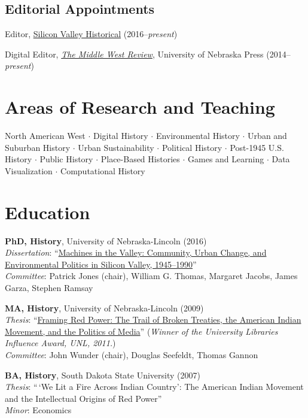 \vspace{0.8cm}

\subsection{Editorial Appointments}\label{editorial-appointments}

Editor, \href{http://svhistorical.org}{Silicon Valley Historical}
(2016--\emph{present})

Digital Editor, \emph{\href{https://uimiddle.wordpress.com/}{The Middle
West Review}}, University of Nebraska Press (2014--\emph{present})

\section{Areas of Research and
Teaching}\label{areas-of-research-and-teaching}

North American West \(\cdot\) Digital History \(\cdot\) Environmental
History \(\cdot\) Urban and Suburban History \(\cdot\) Urban
Sustainability \(\cdot\) Political History \(\cdot\) Post-1945 U.S.
History \(\cdot\) Public History \(\cdot\) Place-Based Histories
\(\cdot\) Games and Learning \(\cdot\) Data Visualization \(\cdot\)
Computational History

\section{Education}\label{education}

\textbf{PhD, History}, University of Nebraska-Lincoln (2016)\\
\emph{Dissertation}:
``\href{http://digitalcommons.unl.edu/historydiss/86/}{Machines in the
Valley: Community, Urban Change, and Environmental Politics in Silicon
Valley, 1945--1990}''\\
\emph{Committee}: Patrick Jones (chair), William G. Thomas, Margaret
Jacobs, James Garza, Stephen Ramsay

\textbf{MA, History}, University of Nebraska-Lincoln (2009)\\
\emph{Thesis}:
``\href{http://digitalcommons.unl.edu/historydiss/21/}{Framing Red
Power: The Trail of Broken Treaties, the American Indian Movement, and
the Politics of Media}'' (\emph{Winner of the University Libraries
Influence Award, UNL, 2011.})\\
\emph{Committee}: John Wunder (chair), Douglas Seefeldt, Thomas Gannon

\textbf{BA, History}, South Dakota State University (2007)\\
\emph{Thesis}: ``\,`We Lit a Fire Across Indian Country': The American
Indian Movement and the Intellectual Origins of Red Power''\\
\emph{Minor}: Economics

